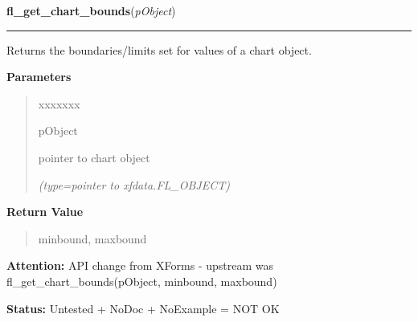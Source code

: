\hspace{.8\funcindent}\begin{boxedminipage}{\funcwidth}

    \raggedright \textbf{fl\_get\_chart\_bounds}(\textit{pObject})

    \vspace{-1.5ex}

    \rule{\textwidth}{0.5\fboxrule}
\setlength{\parskip}{2ex}
    Returns the boundaries/limits set for values of a chart object.

\setlength{\parskip}{1ex}
      \textbf{Parameters}
      \vspace{-1ex}

      \begin{quote}
        \begin{Ventry}{xxxxxxx}

          \item[pObject]

          pointer to chart object

            {\it (type=pointer to xfdata.FL\_OBJECT)}

        \end{Ventry}

      \end{quote}

      \textbf{Return Value}
    \vspace{-1ex}

      \begin{quote}
      minbound, maxbound

      \end{quote}

\textbf{Attention:} API change from XForms - upstream was fl\_get\_chart\_bounds(pObject, 
minbound, maxbound)



\textbf{Status:} Untested + NoDoc + NoExample = NOT OK



    \end{boxedminipage}

    \label{xformslib:library:fl_set_chart_maxnumb}

    \vspace{0.5ex}

